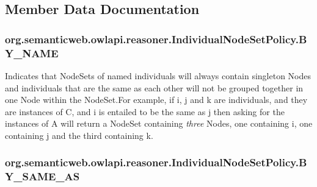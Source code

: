 \subsection{Member Data Documentation}
\hypertarget{enumorg_1_1semanticweb_1_1owlapi_1_1reasoner_1_1_individual_node_set_policy_a1fbf26b542eea4dd37010729986bce6c}{
\subsubsection[{B\-Y\-\_\-\-N\-A\-M\-E}]{\setlength{\rightskip}{0pt plus 5cm}org.\-semanticweb.\-owlapi.\-reasoner.\-Individual\-Node\-Set\-Policy.\-B\-Y\-\_\-\-N\-A\-M\-E}}\label{enumorg_1_1semanticweb_1_1owlapi_1_1reasoner_1_1_individual_node_set_policy_a1fbf26b542eea4dd37010729986bce6c}
Indicates that {\ttfamily Node\-Set}s of named individuals will always contain singleton {\ttfamily Node}s and individuals that are the same as each other will not be grouped together in one {\ttfamily Node} within the {\ttfamily Node\-Set}.For example, if {\ttfamily i}, {\ttfamily j} and {\ttfamily k} are individuals, and they are instances of {\ttfamily C}, and {\ttfamily i} is entailed to be the same as {\ttfamily j} then asking for the instances of {\ttfamily A} will return a {\ttfamily Node\-Set} containing {\itshape three} {\ttfamily Node}s, one containing {\ttfamily i}, one containing {\ttfamily j} and the third containing {\ttfamily k}. \hypertarget{enumorg_1_1semanticweb_1_1owlapi_1_1reasoner_1_1_individual_node_set_policy_af84f77cd66fa440ee5a8597326b098e3}{
\subsubsection[{B\-Y\-\_\-\-S\-A\-M\-E\-\_\-\-A\-S}]{\setlength{\rightskip}{0pt plus 5cm}org.\-semanticweb.\-owlapi.\-reasoner.\-Individual\-Node\-Set\-Policy.\-B\-Y\-\_\-\-S\-A\-M\-E\-\_\-\-A\-S}}\label{enumorg_1_1semanticweb_1_1owlapi_1_1reasoner_1_1_individual_node_set_policy_af84f77cd66fa440ee5a8597326b098e3}
